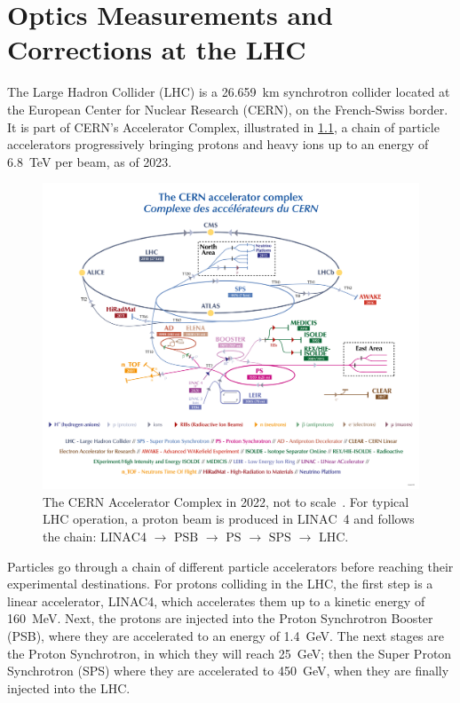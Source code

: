 \chapter{Optics Measurements and Corrections at the LHC}
\label{chapter:lhc_omc} %

The Large Hadron Collider (LHC) is a \qty{26.659}{\kilo\metre} synchrotron collider located at the European Center for Nuclear Research (CERN), on the French-Swiss border.
It is part of CERN's Accelerator Complex, illustrated in \cref{figure:cern_accelerator_complex}, a chain of particle accelerators progressively bringing protons and heavy ions up to an energy of \qty{6.8}{\tera\electronvolt} per beam, as of \num{2023}.

\begin{figure}[!htb]
  \centering
  \includegraphics*[width=0.9\linewidth]{Figures/Optics_Measurements_Corrections_at_LHC/cern_accelerator_complex.png}
  \caption{The CERN Accelerator Complex in \num{2022}, not to scale~\cite{Website:CERN_Accelerator_Complex_Resource}. For typical LHC operation, a proton beam is produced in \(\mathrm{LINAC}\)~\num{4} and follows the chain: \(\mathrm{LINAC}\)\num{4} \(\rightarrow\) \(\mathrm{PSB}\) \(\rightarrow\) \(\mathrm{PS}\) \(\rightarrow\) \(\mathrm{SPS}\) \(\rightarrow\) \(\mathrm{LHC}\).}
  \label{figure:cern_accelerator_complex}
\end{figure}

Particles go through a chain of different particle accelerators before reaching their experimental destinations.
For protons colliding in the LHC, the first step is a linear accelerator, LINAC\num{4}, which accelerates them up to a kinetic energy of \qty{160}{\mega\electronvolt}.
Next, the protons are injected into the Proton Synchrotron Booster (PSB), where they are accelerated to an energy of \qty{1.4}{\giga\electronvolt}.
The next stages are the Proton Synchrotron, in which they will reach \qty{25}{\giga\electronvolt}; then the Super Proton Synchrotron (SPS) where they are accelerated to \qty{450}{\giga\electronvolt}, when they are finally injected into the LHC.

